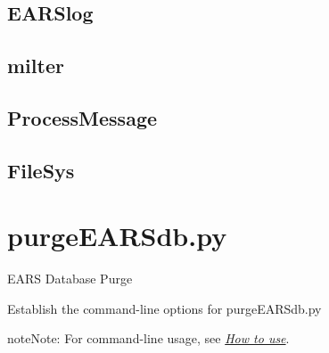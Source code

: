 \documentclass[letterpaper,10pt,english]{sphinxmanual}
\begin{document}
\subsection{EARSlog}
\label{codedocs/EARSmilter:earslog}\label{codedocs/EARSmilter:id1}

\subsection{milter}
\label{codedocs/EARSmilter:milter}\label{codedocs/EARSmilter:id2}

\subsection{ProcessMessage}
\label{codedocs/EARSmilter:processmessage}\label{codedocs/EARSmilter:id3}

\subsection{FileSys}
\label{codedocs/EARSmilter:id4}\label{codedocs/EARSmilter:filesys}

\section{purgeEARSdb.py}
\label{codedocs/purgeEARSdb_py:purgeearsdb-py}\label{codedocs/purgeEARSdb_py::doc}\label{codedocs/purgeEARSdb_py:module-purgeEARSdb}
EARS Database Purge

\begin{fulllineitems}
\label{codedocs/purgeEARSdb_py:purgeEARSdb.purgeEARSdb.Options}
Establish the command-line options for purgeEARSdb.py

\begin{notice}{note}{Note:}
For command-line usage, see {\hyperref[codedocs/purgeEARSdb_py:how-to-use]{\emph{How to use}}}.
\end{notice}

\end{fulllineitems}

\end{document}
